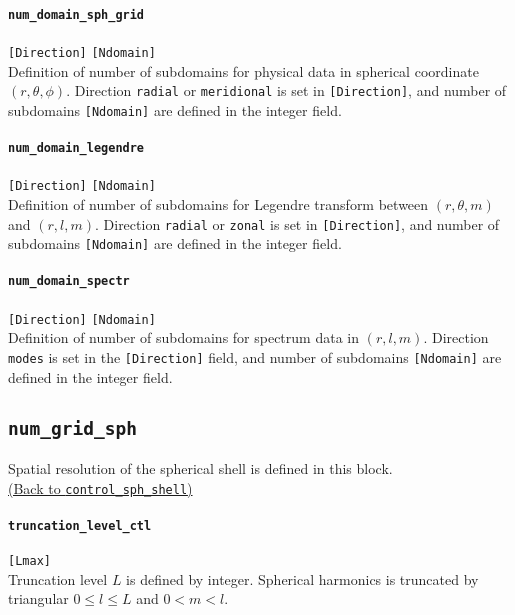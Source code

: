 \paragraph{\tt num\_domain\_sph\_grid}
\label{href_t:num_domain_sph_grid} 
\verb|[Direction]| \verb|[Ndomain]| \\
 Definition of number of subdomains for physical data in spherical coordinate $(r, \theta, \phi)$. Direction {\tt  radial} or {\tt meridional} is set in \verb|[Direction]|, and number of subdomains \verb|[Ndomain]| are defined in the integer field.

\paragraph{\tt num\_domain\_legendre}
\label{href_t:num_domain_legendre}
\verb|[Direction]| \verb|[Ndomain]| \\
 Definition of number of subdomains for Legendre transform between $(r, \theta, m)$ and $(r, l, m)$. Direction {\tt  radial} or {\tt zonal} is set in \verb|[Direction]|, and number of subdomains \verb|[Ndomain]| are defined in the integer field.

\paragraph{\tt num\_domain\_spectr}
\label{href_t:num_domain_spectr}
\verb|[Direction]| \verb|[Ndomain]| \\
Definition of number of subdomains for spectrum data in $(r, l, m)$. Direction {\tt  modes} is set in the \verb|[Direction]| field, and number of subdomains \verb|[Ndomain]| are defined in the integer field.


\subsection{\tt num\_grid\_sph}
\label{href_t:num_grid_sph}
Spatial resolution of the spherical shell is defined in this block. \\
\hyperref[href_i:num_grid_sph]{(Back to {\tt control\_sph\_shell})}

\paragraph{\tt truncation\_level\_ctl}
\label{href_t:truncation_level_ctl}
\verb|[Lmax]| \\
Truncation level $L$ is defined by integer. Spherical harmonics is truncated by triangular $0 \le l \le L$ and $0 <m < l$.

